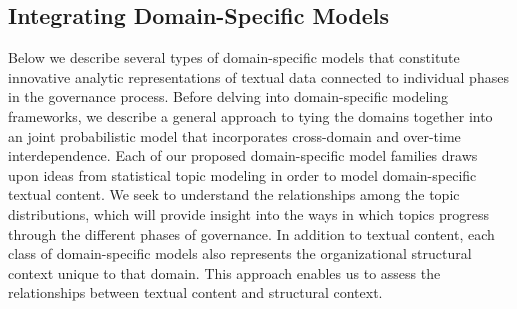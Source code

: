 \subsection{Integrating Domain-Specific Models}

Below we describe several types of domain-specific models that
constitute innovative analytic representations of textual data
connected to individual phases in the governance process. Before
delving into domain-specific modeling frameworks, we describe a
general approach to tying the domains together into an joint
probabilistic model that incorporates cross-domain and over-time
interdependence. Each of our proposed domain-specific model families
draws upon ideas from statistical topic modeling in order to model
domain-specific textual content. We seek to understand the
relationships among the topic distributions,
which will provide insight into the ways in which topics progress
through the different phases of governance.  In addition to textual
content, each class of domain-specific models also represents the
organizational structural context unique to that domain. This approach
enables us to assess the relationships between textual content and
structural context.



